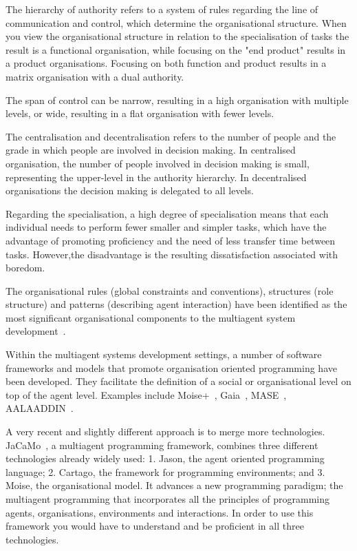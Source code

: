 \documentclass[a4paper,12pt,oneside,fleqn]{book} %
\begin{document}
The hierarchy of authority refers to a system of rules regarding the line
of communication and control, which determine the organisational structure.
When you view the organisational structure in relation to the
specialisation of tasks the result is a functional organisation, while
focusing on the "end product" results in a product organisations. Focusing
on both function and product results in a matrix organisation with a dual
authority.

The span of control can be narrow, resulting in a high organisation with
multiple levels, or wide, resulting in a flat organisation with fewer levels.

The centralisation and decentralisation refers to the number of people and
the grade in which people are involved in decision making. In centralised
organisation, the number of people involved in decision making is small,
representing the upper-level in the authority hierarchy. In decentralised
organisations the decision making is delegated to all levels.

Regarding the specialisation, a high degree of specialisation means that
each individual needs to perform fewer smaller and simpler tasks, which have
the advantage of promoting proficiency and the need of less transfer time
between tasks. However,the disadvantage is the resulting dissatisfaction
associated with boredom.

The organisational rules (global constraints and conventions), structures
(role structure) and patterns (describing agent interaction) have been
identified as the most significant organisational components to the
multiagent system development~\cite{DBLP:conf/aose/ZambonelliJW00}.

Within the multiagent systems development settings, a number of
software frameworks and models that promote organisation oriented
programming have been developed. They facilitate the definition
of a social or organisational level on top of the agent level. Examples
include Moise+~\cite{DBLP:conf/atal/HubnerSB02},
Gaia~\cite{DBLP:journals/aamas/WooldridgeJK00},
MASE~\cite{deloach2001analysis}, AALAADDIN~\cite{ferber1998meta}.  

A very recent and slightly different approach is to merge more
technologies. JaCaMo~\cite{DBLP:journals/scp/BoissierBHRS13}, a multiagent programming framework, combines
three different technologies already widely used: 1. Jason, the agent
oriented programming language; 2. Cartago, the framework for programming
environments; and 3. Moise, the organisational model. It advances a new
programming paradigm; the multiagent programming that incorporates all the
principles of programming agents, organisations, environments and
interactions. In order to use this framework you would have to understand
and be proficient in all three technologies.
\end{document}
